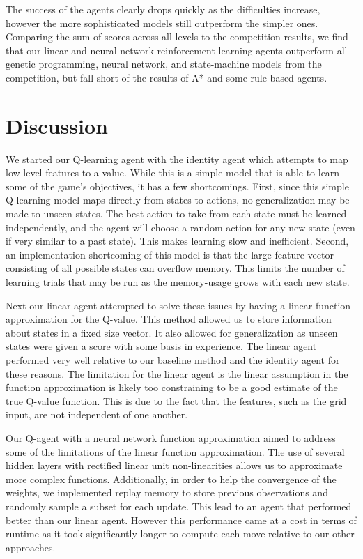 \documentclass[12pt]{article}
\begin{document}
The success of the agents clearly drops quickly as the difficulties increase, however the more sophisticated models still outperform the simpler ones. Comparing the sum of scores across all levels to the competition results, we find that our linear and neural network reinforcement learning agents outperform all genetic programming, neural network, and state-machine models from the competition, but fall short of the results of A* and some rule-based agents.

\section{Discussion}

We started our Q-learning agent with the identity agent which attempts to map low-level features to a value. While this is a simple model that is able to learn some of the game's objectives, it has a few shortcomings. First, since this simple Q-learning model maps directly from states to actions, no generalization may be made to unseen states. The best action to take from each state must be learned independently, and the agent will choose a random action for any new state (even if very similar to a past state). This makes learning slow and inefficient. Second, an implementation shortcoming of this model is that the large feature vector consisting of all possible states can overflow memory. This limits the number of learning trials that may be run as the memory-usage grows with each new state.

Next our linear agent attempted to solve these issues by having a linear function approximation for the Q-value. This method allowed us to store information about states in a fixed size vector. It also allowed for generalization as unseen states were given a score with some basis in experience. The linear agent performed very well relative to our baseline method and the identity agent for these reasons. The limitation for the linear agent is the linear assumption in the function approximation is likely too constraining to be a good estimate of the true Q-value function. This is due to the fact that the features, such as the grid input, are not independent of one another.

Our Q-agent with a neural network function approximation aimed to address some of the limitations of the linear function approximation. The use of several hidden layers with rectified linear unit non-linearities allows us to approximate more complex functions. Additionally, in order to help the convergence of the weights, we implemented replay memory to store previous observations and randomly sample a subset for each update. This lead to an agent that performed better than our linear agent. However this performance came at a cost in terms of runtime as it took significantly longer to compute each move relative to our other approaches.
\end{document}
